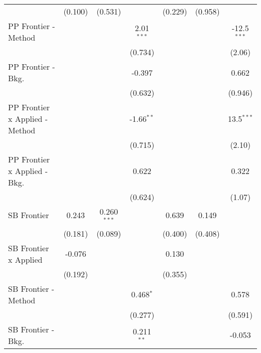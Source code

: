 \begin{tabular}{lcccccc}
                                  & (0.100)        & (0.531)       &               & (0.229)       & (0.958)       &   \\   
   PP Frontier - Method           &                &               & 2.01$^{***}$  &               &               & -12.5$^{***}$\\   
                                  &                &               & (0.734)       &               &               & (2.06)\\   
   PP Frontier - Bkg.             &                &               & -0.397        &               &               & 0.662\\   
                                  &                &               & (0.632)       &               &               & (0.946)\\   
   PP Frontier x Applied - Method &                &               & -1.66$^{**}$  &               &               & 13.5$^{***}$\\   
                                  &                &               & (0.715)       &               &               & (2.10)\\   
   PP Frontier x Applied - Bkg.   &                &               & 0.622         &               &               & 0.322\\   
                                  &                &               & (0.624)       &               &               & (1.07)\\   
   SB Frontier                    & 0.243          & 0.260$^{***}$ &               & 0.639         & 0.149         &   \\   
                                  & (0.181)        & (0.089)       &               & (0.400)       & (0.408)       &   \\   
   SB Frontier x Applied          & -0.076         &               &               & 0.130         &               &   \\   
                                  & (0.192)        &               &               & (0.355)       &               &   \\   
   SB Frontier - Method           &                &               & 0.468$^{*}$   &               &               & 0.578\\   
                                  &                &               & (0.277)       &               &               & (0.591)\\   
   SB Frontier - Bkg.             &                &               & 0.211$^{**}$  &               &               & -0.053\\   

\end{tabular}
